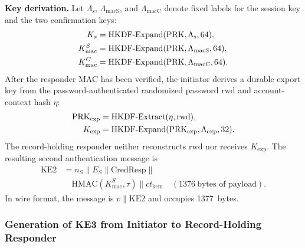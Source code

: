 \documentclass[preprint,12pt]{elsarticle}
\newcommand{\KLabel}[1]{\Lambda_{\mathrm{#1}}}
\theoremstyle{remark}
\begin{document}
\textbf{Key derivation.} Let
$\KLabel{s}$, $\KLabel{macS}$, and $\KLabel{macC}$
denote fixed labels for the session key and the two
confirmation keys:
\begin{align}
  K_s &= \mathrm{HKDF\text{-}Expand}(\mathrm{PRK}, \KLabel{s}, 64),
  \notag\\
  K_{\mathrm{mac}}^S &= \mathrm{HKDF\text{-}Expand}(\mathrm{PRK},
    \KLabel{macS}, 64),
  \notag\\
  K_{\mathrm{mac}}^C &= \mathrm{HKDF\text{-}Expand}(\mathrm{PRK},
    \KLabel{macC}, 64).
  \label{eq:key-derivation}
\end{align}
After the responder MAC has been verified, the initiator derives a durable
export key from the password-authenticated randomized password
$\mathrm{rwd}$ and account-context hash $\eta$:
\begin{align}
  \mathrm{PRK}_{\mathrm{exp}} &=
    \mathrm{HKDF\text{-}Extract}(\eta, \mathrm{rwd}),
  \notag\\
  K_{\mathrm{exp}} &=
    \mathrm{HKDF\text{-}Expand}(\mathrm{PRK}_{\mathrm{exp}},
      \KLabel{exp}, 32).
  \label{eq:export-key-derivation}
\end{align}
The record-holding responder neither reconstructs $\mathrm{rwd}$ nor receives
$K_{\mathrm{exp}}$.
The resulting second authentication message is
\begin{equation}
  \begin{aligned}
    \mathrm{KE2} &= n_S \| E_S \| \mathrm{CredResp} \| {}\\
    &\quad \mathrm{HMAC}(K_{\mathrm{mac}}^S, \tau) \| ct_{\mathrm{kem}}
      \quad(1376~\text{bytes of payload}).
  \end{aligned}
\end{equation}
In wire format, the message is $v \| \mathrm{KE2}$ and occupies
1377~bytes.

\subsubsection{Generation of KE3 from Initiator to Record-Holding Responder}
\end{document}
